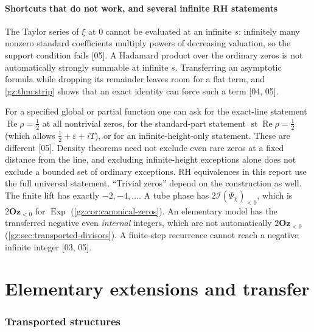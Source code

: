 \documentclass[11pt,a4paper]{article}
\numberwithin{equation}{section}
\theoremstyle{definition}
\theoremstyle{remark}
\newcommand{\Oz}{\mathbf{Oz}}
\newcommand{\eps}{\varepsilon}
\renewcommand{\Re}{\operatorname{Re}}
\newcommand{\st}{\operatorname{st}}
\newcommand{\Exp}{\operatorname{Exp}}
\newcommand{\cI}{\mathcal I}
\newcommand{\src}[1]{\textup{[#1]}}
\begin{document}
\subsection{Shortcuts that do not work, and several infinite RH statements}
The Taylor series of $\xi$ at $0$ cannot be evaluated at an infinite $s$:
infinitely many nonzero standard coefficients multiply powers of decreasing
valuation, so the support condition fails \src{05}. A Hadamard product over
the ordinary zeros is not automatically strongly summable at infinite $s$.
Transferring an asymptotic formula while dropping its remainder leaves room
for a flat term, and \cref{gz:thm:strip} shows that an exact identity can
force such a term \src{04, 05}.

For a specified global or partial function one can ask for the exact-line
statement $\Re\rho=\tfrac12$ at all nontrivial zeros, for the standard-part
statement $\st\Re\rho=\tfrac12$ (which allows $\tfrac12+\eps+iT$), or for an
infinite-height-only statement. These are different \src{05}. Density
theorems need not exclude even rare zeros at a fixed distance from the line,
and excluding infinite-height exceptions alone does not exclude a bounded set
of ordinary exceptions. RH equivalences in this report use the full
universal statement. ``Trivial zeros'' depend on the construction as well.
The finite lift has exactly $-2,-4,\dots$. A tube phase has $2\cI(\Psi_\chi)_{<0}$,
which is $2\Oz_{<0}$ for $\Exp$ (\cref{gz:cor:canonical-zeros}). An
elementary model has the transferred negative even \emph{internal} integers,
which are not automatically $2\Oz_{<0}$ (\cref{gz:sec:transported-divisors}).
A finite-step recurrence cannot reach a negative infinite integer
\src{03, 05}.

\part{Elementary extensions and transfer}\label{gz:part:transfer}

\section{Transported structures}\label{gz:sec:transfer}
\end{document}
